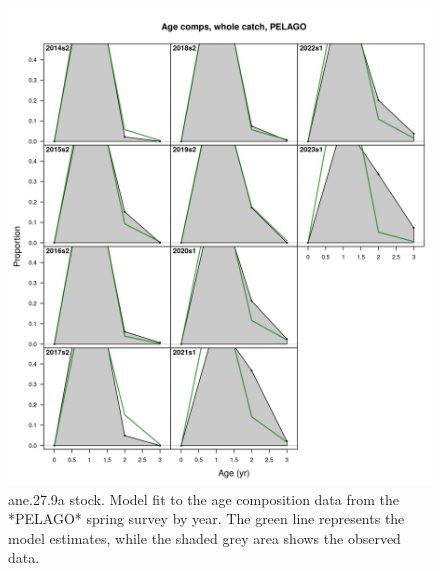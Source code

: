 \documentclass[
]{article}
\begin{document}
\begin{figure}[H]

{\centering \includegraphics[width=0.95\linewidth]{report/run/S1.0_4FLEETS/fig_age_fit_Pelago} 

}

\caption{ane.27.9a stock. Model fit to the age composition data from the *PELAGO* spring survey by year. The green line represents the model estimates, while the shaded grey area shows the observed data.}\label{fig:unnamed-chunk-23}
\end{figure}
\end{document}

